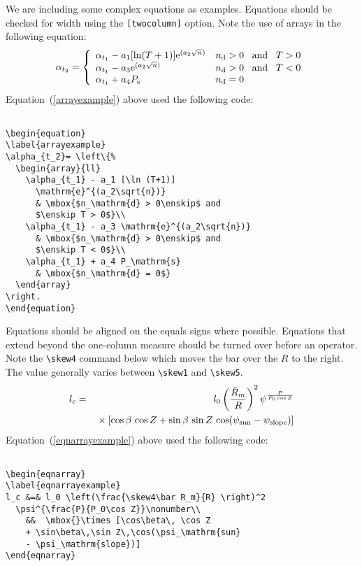 \documentclass[review,oneside]{igs}
\begin{document}
We are including some complex equations as examples. Equations should be checked for width using the \verb"[twocolumn]" option. Note the use of arrays in the following equation:
\begin{equation}
\label{arrayexample}
\alpha_{t_2}= \left\{%
  \begin{array}{ll}
    \alpha_{t_1} - a_1 [\ln (T+1)]
      \mathrm{e}^{(a_2\sqrt{n})}
      & \mbox{$n_\mathrm{d} > 0\enskip$ and
      $\enskip T > 0$}\\
    \alpha_{t_1} - a_3 \mathrm{e}^{(a_2\sqrt{n})}
      & \mbox{$n_\mathrm{d} > 0\enskip$ and
      $\enskip T < 0$}\\
    \alpha_{t_1} + a_4 P_\mathrm{s}
      & \mbox{$n_\mathrm{d} = 0$}
  \end{array}
\right.
\end{equation}
Equation~(\ref{arrayexample}) above used the following code:
\begin{verbatim}

\begin{equation}
\label{arrayexample}
\alpha_{t_2}= \left\{%
  \begin{array}{ll}
    \alpha_{t_1} - a_1 [\ln (T+1)]
      \mathrm{e}^{(a_2\sqrt{n})}
      & \mbox{$n_\mathrm{d} > 0\enskip$ and
      $\enskip T > 0$}\\
    \alpha_{t_1} - a_3 \mathrm{e}^{(a_2\sqrt{n})}
      & \mbox{$n_\mathrm{d} > 0\enskip$ and
      $\enskip T < 0$}\\
    \alpha_{t_1} + a_4 P_\mathrm{s}
      & \mbox{$n_\mathrm{d} = 0$}
  \end{array}
\right.
\end{equation}

\end{verbatim}
Equations should be aligned on the equals signs where possible. Equations that extend beyond the one-column measure should be turned over before an operator. Note the \verb"\skew4" command below which moves the bar over the $R$ to the right. The value generally varies between \verb"\skew1" and \verb"\skew5".
\begin{eqnarray}
\label{eqnarrayexample}
l_c &=& l_0 \left(\frac{\skew4\bar R_m}{R} \right)^2
  \psi^{\frac{P}{P_0\cos Z}}\nonumber\\
    &&  \mbox{}\times [\cos\beta\, \cos Z
    + \sin\beta\,\sin Z\,\cos(\psi_\mathrm{sun}
    - \psi_\mathrm{slope})]
\end{eqnarray}
Equation~(\ref{eqnarrayexample}) above used the following code:
\begin{verbatim}

\begin{eqnarray}
\label{eqnarrayexample}
l_c &=& l_0 \left(\frac{\skew4\bar R_m}{R} \right)^2
  \psi^{\frac{P}{P_0\cos Z}}\nonumber\\
    &&  \mbox{}\times [\cos\beta\, \cos Z
    + \sin\beta\,\sin Z\,\cos(\psi_\mathrm{sun}
    - \psi_\mathrm{slope})]
\end{eqnarray}

\end{verbatim}
\end{document}
